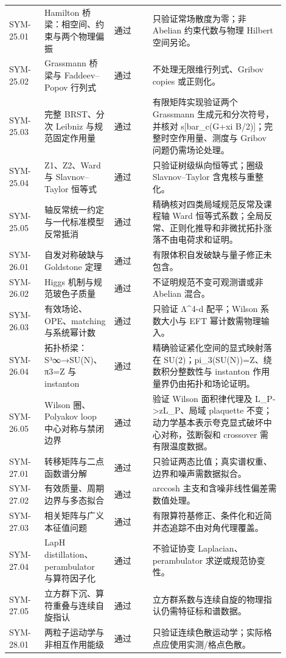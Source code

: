\begin{longtable}{p{0.12\linewidth}p{0.20\linewidth}p{0.13\linewidth}p{0.45\linewidth}}
SYM-25.01 & Hamilton 桥梁：相空间、约束与两个物理偏振 & 通过 & 只验证常场散度为零；非 Abelian 约束代数与物理 Hilbert 空间另论。\\
SYM-25.02 & Grassmann 桥梁与 Faddeev--Popov 行列式 & 通过 & 不处理无限维行列式、Gribov copies 或正则化。\\
SYM-25.03 & 完整 BRST、分次 Leibniz 与规范固定作用量 & 通过 & 有限矩阵实现验证两个 Grassmann 生成元和分次符号，并核对 s[bar\_c(G+xi B/2)]；完整时空作用量、测度与 Gribov 问题仍需场论处理。\\
SYM-25.04 & Z1、Z2、Ward 与 Slavnov--Taylor 恒等式 & 通过 & 只验证树级纵向恒等式；圈级 Slavnov--Taylor 含鬼核与重整化。\\
SYM-25.05 & 轴反常统一约定与一代标准模型反常抵消 & 通过 & 精确核对四类局域规范反常及课程轴 Ward 恒等式系数；全局反常、正则化推导和非微扰拓扑涨落不由电荷求和证明。\\
SYM-26.01 & 自发对称破缺与 Goldstone 定理 & 通过 & 有限体积自发破缺与量子修正未包含。\\
SYM-26.02 & Higgs 机制与规范玻色子质量 & 通过 & 不证明规范不变可观测谱或非 Abelian 混合。\\
SYM-26.03 & 有效场论、OPE、matching 与系统幂计数 & 通过 & 只验证 Λ^{4-d} 配平；Wilson 系数大小与 EFT 幂计数需物理输入。\\
SYM-26.04 & 拓扑桥梁：S³∞→SU(N)、π3=Z 与 instanton & 通过 & 精确验证紧化空间的显式映射落在 SU(2)；pi\_3(SU(N))=Z、绕数积分整数性与 instanton 作用量界仍由拓扑和场论证明。\\
SYM-26.05 & Wilson 圈、Polyakov loop 中心对称与禁闭边界 & 通过 & 验证 Wilson 面积律代理及 L\_P->zL\_P、局域 plaquette 不变；动力学基本表示夸克显式破坏中心对称，弦断裂和 crossover 需有限温度数据。\\
SYM-27.01 & 转移矩阵与二点函数谱分解 & 通过 & 只验证两态比值；真实谱权重、边界和噪声需数据拟合。\\
SYM-27.02 & 有效质量、周期边界与多态拟合 & 通过 & arccosh 主支和含噪非线性偏差需数值处理。\\
SYM-27.03 & 相关矩阵与广义本征值问题 & 通过 & 有限算符基修正、条件化和近简并态追踪不由对角代理覆盖。\\
SYM-27.04 & LapH distillation、perambulator 与算符因子化 & 通过 & 不验证协变 Laplacian、perambulator 求逆或规范协变性。\\
SYM-27.05 & 立方群下沉、算符重叠与连续自旋指认 & 通过 & 立方群系数与连续自旋的物理指认仍需特征标和谱数据。\\
SYM-28.01 & 两粒子运动学与非相互作用能级 & 通过 & 只验证连续色散运动学；实际格点应使用实测/格点色散。\\

\end{longtable}
